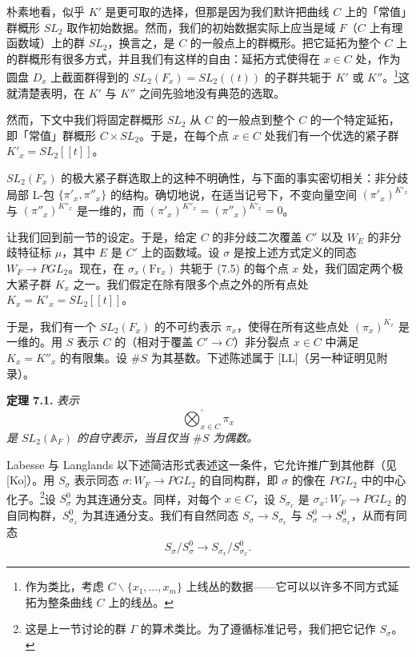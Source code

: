 \documentclass[11pt,a4paper]{article}
\newenvironment{namedthm}[1]
  {\par\medskip\noindent\textbf{定理 #1.}\itshape\ignorespaces}
  {\par\medskip}
\begin{document}
朴素地看，似乎 $K'$ 是更可取的选择，但那是因为我们默许把曲线 $C$ 上的「常值」群概形 $SL_2$ 取作初始数据。然而，我们的初始数据实际上应当是域 $F$（$C$ 上有理函数域）上的群 $SL_2$，换言之，是 $C$ 的一般点上的群概形。把它延拓为整个 $C$ 上的群概形有很多方式，并且我们有这样的自由：延拓方式使得在 $x\in C$ 处，作为圆盘 $D_x$ 上截面群得到的 $SL_2(F_x)=SL_2((t))$ 的子群共轭于 $K'$ 或 $K''$。\footnote{作为类比，考虑 $C\backslash\{x_1,\ldots,x_m\}$ 上线丛的数据——它可以以许多不同方式延拓为整条曲线 $C$ 上的线丛。}这就清楚表明，在 $K'$ 与 $K''$ 之间先验地没有典范的选取。

然而，下文中我们将固定群概形 $SL_2$ 从 $C$ 的一般点到整个 $C$ 的一个特定延拓，即「常值」群概形 $C\times SL_2$。于是，在每个点 $x\in C$ 处我们有一个优选的紧子群 $K'_x=SL_2[[t]]$。

$SL_2(F_x)$ 的极大紧子群选取上的这种不明确性，与下面的事实密切相关：非分歧局部 L-包 $\{\pi'_x,\pi''_x\}$ 的结构。确切地说，在适当记号下，不变向量空间 $(\pi'_x)^{K'_x}$ 与 $(\pi''_x)^{K''_x}$ 是一维的，而 $(\pi'_x)^{K''_x}=(\pi''_x)^{K'_x}=0$。

让我们回到前一节的设定。于是，给定 $C$ 的非分歧二次覆盖 $C'$ 以及 $W_E$ 的非分歧特征标 $\mu$，其中 $E$ 是 $C'$ 上的函数域。设 $\sigma$ 是按上述方式定义的同态 $W_F\to PGL_2$。现在，在 $\sigma_x(\mathrm{Fr}_x)$ 共轭于 (7.5) 的每个点 $x$ 处，我们固定两个极大紧子群 $K_x$ 之一。我们假定在除有限多个点之外的所有点处 $K_x=K'_x=SL_2[[t]]$。

于是，我们有一个 $SL_2(F_x)$ 的不可约表示 $\pi_x$，使得在所有这些点处 $(\pi_x)^{K_x}$ 是一维的。用 $S$ 表示 $C$ 的（相对于覆盖 $C'\to C$）非分裂点 $x\in C$ 中满足 $K_x=K''_x$ 的有限集。设 $\#S$ 为其基数。下述陈述属于 [LL]（另一种证明见附录）。


\begin{namedthm}{7.1}
表示
\begin{equation}\tag{7.8}
\bigotimes_{x\in C}^{\prime}\pi_x
\end{equation}
是 $SL_2(\mathbb{A}_F)$ 的自守表示，当且仅当 $\#S$ 为偶数。
\end{namedthm}

Labesse 与 Langlands 以下述简洁形式表述这一条件，它允许推广到其他群（见 [Ko]）。用 $S_\sigma$ 表示同态 $\sigma: W_F\to PGL_2$ 的自同构群，即 $\sigma$ 的像在 $PGL_2$ 中的中心化子。\footnote{这是上一节讨论的群 $\Gamma$ 的算术类比。为了遵循标准记号，我们把它记作 $S_\sigma$。}设 $S_\sigma^0$ 为其连通分支。同样，对每个 $x\in C$，设 $S_{\sigma_x}$ 是 $\sigma_x: W_F\to PGL_2$ 的自同构群，$S_{\sigma_x}^0$ 为其连通分支。我们有自然同态 $S_\sigma\to S_{\sigma_x}$ 与 $S_\sigma^0\to S_{\sigma_x}^0$，从而有同态
\begin{equation}\tag{7.9}
S_\sigma/S_\sigma^0\to S_{\sigma_x}/S_{\sigma_x}^0.
\end{equation}
\end{document}

